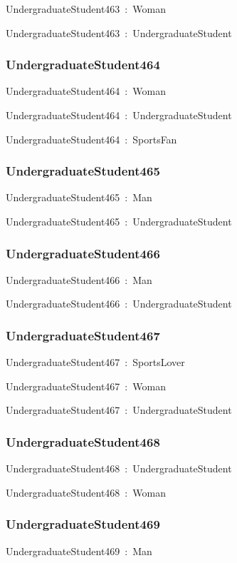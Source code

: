\documentclass{article}
\begin{document}
UndergraduateStudent463~:~Woman

UndergraduateStudent463~:~UndergraduateStudent

\subsubsection*{UndergraduateStudent464}

UndergraduateStudent464~:~Woman

UndergraduateStudent464~:~UndergraduateStudent

UndergraduateStudent464~:~SportsFan

\subsubsection*{UndergraduateStudent465}

UndergraduateStudent465~:~Man

UndergraduateStudent465~:~UndergraduateStudent

\subsubsection*{UndergraduateStudent466}

UndergraduateStudent466~:~Man

UndergraduateStudent466~:~UndergraduateStudent

\subsubsection*{UndergraduateStudent467}

UndergraduateStudent467~:~SportsLover

UndergraduateStudent467~:~Woman

UndergraduateStudent467~:~UndergraduateStudent

\subsubsection*{UndergraduateStudent468}

UndergraduateStudent468~:~UndergraduateStudent

UndergraduateStudent468~:~Woman

\subsubsection*{UndergraduateStudent469}

UndergraduateStudent469~:~Man
\end{document}
